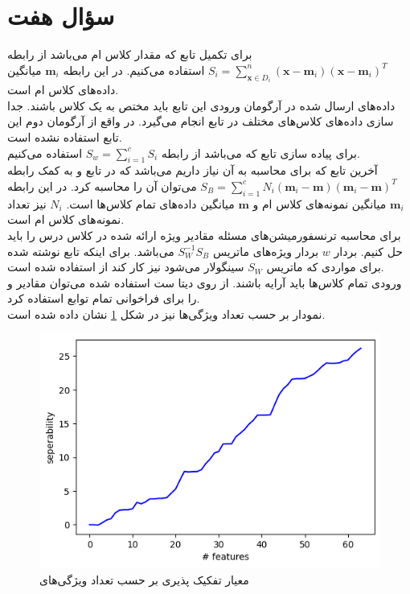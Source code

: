 \documentclass[12pt,onecolumn,a4paper]{article}
\begin{document}
\newpage
\section*{سؤال هفت}
برای تکمیل تابع  که مقدار  کلاس ام می‌باشد از رابطه 
$S_{i}=\sum_{\boldsymbol{x} \in D_{i}}^{n}\left(\boldsymbol{x}-\boldsymbol{m}_{i}\right)\left(\boldsymbol{x}-\boldsymbol{m}_{i}\right)^{T}$
استفاده می‌کنیم. در این رابطه $\boldsymbol{m}_{i}$ میانگین داده‌های کلاس ام است. \\
داده‌های ارسال شده در آرگومان ورودی این تابع باید مختص به یک کلاس باشند. جدا سازی داده‌های کلاس‌های مختلف در تابع  انجام می‌گیرد. در واقع از آرگومان دوم این تابع استفاده نشده است.
\\
برای پیاده سازی تابع  که  می‌باشد از رابطه
$S_{w}=\sum_{i=1}^{c}S_{i}$
استفاده می‌کنیم.
\\
آخرین تابع که برای محاسبه  به آن نیاز داریم  می‌باشد که در تابع  و به کمک رابطه 
$S_{B}=\sum_{i=1}^{c} N_{i}\left(\boldsymbol{m}_{i}-\boldsymbol{m}\right)\left(\boldsymbol{m}_{i}-\boldsymbol{m}\right)^{T}$
می‌توان آن را محاسبه کرد. در این رابطه $\boldsymbol{m}_{i}$ میانگین نمونه‌های کلاس ام و $\boldsymbol{m}$ میانگین داده‌های تمام کلاس‌ها است. $N_{i}$ نیز تعداد نمونه‌های کلاس ام است.
\\
برای محاسبه ترنسفورمیشن‌های  مسئله مقادیر ویژه ارائه شده در کلاس درس را باید حل کنیم. بردار $w$ بردار ویژه‌های ماتریس $S_{W}^{-1}S_{B}$ می‌باشد. برای اینکه تابع نوشته شده برای مواردی که ماتریس $S_{W}$ سینگولار می‌شود نیز کار کند از  استفاده شده است.
\\
ورودی تمام کلاس‌ها باید آرایه  باشند. از روی دیتا ست استفاده شده می‌توان مقادیر  و  را برای فراخوانی تمام توابع استفاده کرد.
\\
نمودار  بر حسب تعداد ویژگی‌ها نیز در شکل \ref{fig:3} نشان داده شده است.
\begin{figure}[h!]
    \begin{center}
    \includegraphics[scale=0.55]{plots/q7_c.png}
    \caption{معیار تفکیک پذیری بر حسب تعداد ویژگی‌های }
    \label{fig:3}
    \end{center}
\end{figure}
\end{document}
